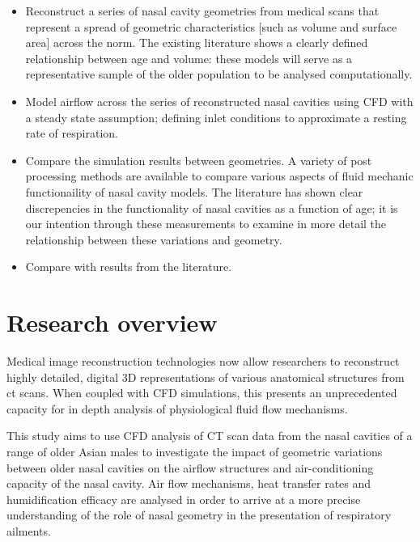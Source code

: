 \begin{itemize}

  \item Reconstruct a series of nasal cavity geometries from medical scans that represent a spread of geometric characteristics [such as volume and surface area] across the norm. The existing literature shows a clearly defined relationship between age and volume: these models will serve as a representative sample of the older population to be analysed computationally.

  \item Model airflow across the series of reconstructed nasal cavities using CFD with a steady state assumption; defining inlet conditions to approximate a resting rate of respiration. 

  \item Compare the simulation results between geometries. A variety of post processing methods are available to compare various aspects of fluid mechanic functionaility of nasal cavity models. The literature has shown clear discrepencies in the functionality of nasal cavities as a function of age; it is our intention through these measurements to examine in more detail the relationship between these variations and geometry.

  \item  Compare with results from the literature. 
\end{itemize}
 
\section{Research overview}

Medical image reconstruction technologies now allow researchers to reconstruct highly detailed, digital 3D representations of various anatomical structures from ct scans. When coupled with CFD simulations, this presents an unprecedented capacity for in depth analysis of physiological fluid flow mechanisms.

This study aims to use CFD analysis of CT scan data from the nasal cavities of a range of older Asian males to investigate the impact of geometric variations between older nasal cavities on the airflow structures and air-conditioning capacity of the nasal cavity. Air flow mechanisms, heat transfer rates and humidification efficacy are analysed in order to arrive at a more precise understanding of the role of nasal geometry in the presentation of respiratory ailments.

